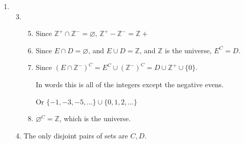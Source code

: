 \documentclass[12pt,letterpaper]{article}
\begin{document}
\begin{enumerate}
\begin{enumerate}
\begin{proof}
            Since we have shown both directions,
            we have shown for any sets $A, B$, $A = B$ if and only if $\mathcal{P}(A) = \mathcal{P}(B)$.
          \end{proof}
      \end{enumerate}
    \item
      \begin{enumerate}
        \setcounter{enumii}{2}
        \item
          \begin{enumerate}
            \setcounter{enumiii}{4}
            \item
              Since $\mathbb{Z}^+ \cap \mathbb{Z}^- = \varnothing$, $\mathbb{Z}^+ - \mathbb{Z}^- = \mathbb{Z}+$
            \item
              Since $E \cap D = \varnothing$, and $E \cup D = \mathbb{Z}$, and $\mathbb{Z}$ is the universe, $E^C = D$.
            \setcounter{enumiii}{7}
            \item
              Since $\left(E \cap \mathbb{Z}^-\right)^C = E^C \cup \left(\mathbb{Z}^-\right)^C = D \cup \mathbb{Z}^+ \cup \{0\}$.

              In words this is all of the integers except the negative evens.

              Or $\{-1, -3, -5, \dots\} \cup \{0, 1, 2, \dots\}$
            \item
              $\varnothing^C = \mathbb{Z}$, which is the universe.
          \end{enumerate}
        \setcounter{enumii}{4}
        \item
          The only disjoint pairs of sets are $C, D$.
      \end{enumerate}
  \end{enumerate}
\end{document}
